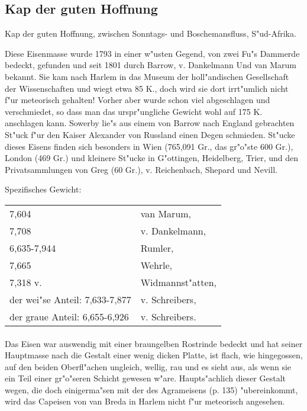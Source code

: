 \documentclass[a4paper, 11pt, oneside]{article}
\begin{document}
\subsection{Kap der guten Hoffnung}

Kap der guten Hoffnung, zwischen Sonntags- und Boschemansfluss, S"ud-Afrika.

Diese Eisenmasse wurde 1793 in einer w"usten Gegend, von zwei Fu"s Dammerde bedeckt, gefunden und seit 1801 durch Barrow, v. Dankelmann Und van Marum bekannt. Sie kam nach Harlem in das Museum der holl"andischen Gesellschaft der Wissenschaften und wiegt etwa 85 K., doch wird sie dort irrt"umlich nicht f"ur meteorisch gehalten! Vorher aber wurde schon viel abgeschlagen und verschmiedet, so dass man das urspr"ungliche Gewicht wohl auf 175 K. anschlagen kann. Sowerby lie"s aus einem von Barrow nach England gebrachten St"uck f"ur den Kaiser Alexander von Russland einen Degen schmieden. St"ucke dieses Eisens finden sich besonders in Wien (765,091 Gr., das gr"o"ste 600 Gr.), London (469 Gr.) und kleinere St"ucke in G"ottingen, Heidelberg, Trier, und den Privatsammlungen von Greg (60 Gr.), v. Reichenbach, Shepard und Nevill.

Spezifisches Gewicht:  
\begin{table}[!ht]
    \centering
    \begin{tabular}{l l}
        7,604 & van Marum,\\
        7,708 & v. Dankelmann,\\
        6,635-7,944 & Rumler,\\
        7,665 & Wehrle,\\
        7,318 v. & Widmannst"atten,\\
        der wei"se Anteil: 7,633-7,877 & v. Schreibers,\\
        der graue Anteil: 6,655-6,926 & v. Schreibers.
    \end{tabular}
\end{table}
\paragraph{}
Das Eisen war auswendig mit einer braungelben Rostrinde bedeckt und hat seiner Hauptmasse nach die Gestalt einer wenig dicken Platte, ist flach, wie hingegossen, auf den beiden Oberfl"achen ungleich, wellig, rau und es sieht aus, als wenn sie ein Teil einer gr"o"seren Schicht gewesen w"are. Haupts"achlich dieser Gestalt wegen, die doch einigerma"sen mit der des Agrameisens (p. 135) "ubereinkommt, wird das Capeisen von van Breda in Harlem nicht f"ur meteorisch angesehen.
\end{document}
